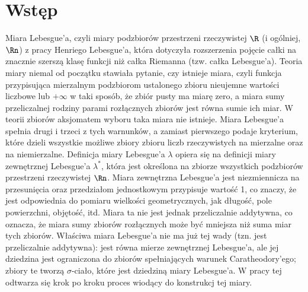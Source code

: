 \section{Wstęp}
Miara Lebesgue'a, czyli miary podzbiorów przestrzeni rzeczywistej $\R$ (i ogólniej, $\Rn$) z pracy Henriego Lebesgue’a, która dotyczyła rozszerzenia pojęcie całki na znacznie szerszą klasę funkcji niż całka Riemanna (tzw. całka Lebesgue’a). Teoria miary niemal od początku stawiała pytanie, czy istnieje miara, czyli funkcja przypisująca mierzalnym podzbiorom ustalonego zbioru nieujemne wartości liczbowe lub $+\infty$ w taki sposób, że zbiór pusty ma miarę zero, a miara sumy przeliczalnej rodziny parami rozłącznych zbiorów jest równa sumie ich miar. W teorii zbiorów aksjomatem wyboru taka miara nie istnieje. Miara Lebesgue'a spełnia drugi i trzeci z tych warnunków, a zamiast pierwszego podaje kryterium, które dzieli wszystkie możliwe zbiory zbioru liczb rzeczywistych na mierzalne oraz na niemierzalne. Definicja miary Lebesgue'a $\lambda$ opiera się na definicji miary zewnętrznej Lebesgue’a $\lambda^{*}$, która jest określona na zbiorze wszystkich podzbiorów przestrzeni rzeczywistej $\Rn$. Miara zewnętrzna Lebesgue’a jest niezmiennicza na przesunięcia oraz przedziałom jednostkowym przypisuje wartość 1, co znaczy, że jest odpowiednia do pomiaru wielkości geometrycznych, jak długość, pole powierzchni, objętość, itd. Miara ta nie jest jednak przeliczalnie addytywna, co oznacza, że miara sumy zbiorów rozłącznych może być mniejsza niż suma miar tych zbiorów. Właściwa miara Lebesgue'a nie ma już tej wady (tzn. jest przeliczalnie addytywna): jest równa mierze zewnętrznej Lebesgue'a, ale jej dziedzina jest ograniczona do zbiorów spełniających warunek Caratheodory’ego; zbiory te tworzą $\sigma$-ciało, które jest dziedziną miary Lebesgue’a. W pracy tej odtwarza się krok po kroku proces wiodący do konstrukcj tej miary.
